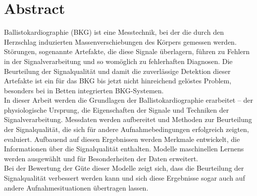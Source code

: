 \clearpage
\chapter*{Abstract}\label{abstract}


Ballistokardiographie (BKG) ist eine Messtechnik, bei der die durch den Herzschlag induzierten Massenverschiebungen des Körpers gemessen werden. Störungen, sogenannte Artefakte, die diese Signale überlagern, führen zu Fehlern in der Signalverarbeitung und so womöglich zu fehlerhaften Diagnosen. Die Beurteilung der Signalqualität und damit die zuverlässige Detektion dieser Artefakte ist ein für das BKG bis jetzt nicht hinreichend gelöstes Problem, besonders bei in Betten integrierten BKG-Systemen.\\ 
In dieser Arbeit werden die Grundlagen der Ballistokardiographie erarbeitet -- der physiologische Ursprung, die Eigenschaften der Signale und Techniken der Signalverarbeitung. Messdaten werden aufbereitet und Methoden zur Beurteilung der Signalqualität, die sich für andere Aufnahmebedingungen erfolgreich zeigten, evaluiert. Aufbauend auf diesen Ergebnissen werden Merkmale entwickelt, die Informationen über die Signalqualität enthalten. Modelle maschinellen Lernens werden ausgewählt und für Besonderheiten der Daten erweitert.\\
Bei der Bewertung der Güte dieser Modelle zeigt sich, dass die Beurteilung der Signalqualität verbessert werden kann und sich diese Ergebnisse sogar auch auf andere Aufnahmesituationen übertragen lassen.

